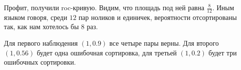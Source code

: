 \documentclass[12pt, a4paper, oneside]{article}
\begin{document}
{\begin{enumerate}
	Профит, получили roc-кривую.  Видим, что площадь под ней равна $\frac{8}{12}$. Иным языком говоря, среди $12$ пар ноликов и единичек, вероятности отсортированы так, как нам хотелось бы $8$ раз. 
	
	Для первого наблюдения $(1, 0.9)$ все четыре пары верны. Для второго $(1, 0.56)$ будет одна ошибочная сортировка, для третьей $(1,0.2)$ будет три ошибочных сортировки. 
	\end{enumerate}
	
}
\end{document}
